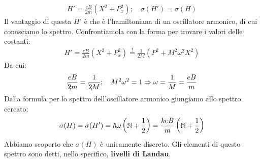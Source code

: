 \documentclass[../../FisicaTeorica.tex]{subfiles}
\begin{document}
\begin{enumerate}
\begin{align*}
H'=\frac{eB}{2m}\left(X^2+P_x^2\right); \quad \sigma(H')=\sigma(H)
\end{align*} 
Il vantaggio di questa $H'$ è che è l'hamiltoniana di un oscillatore armonico, di cui conosciamo lo spettro. Confrontiamola con la forma  per trovare i valori delle costanti:
\begin{align*}
H'=\frac{eB}{2m}\left(X^2 + P_x^2\right) \overset{!}{=} \frac{1}{2M}\left(P^2 + M^2 \omega^2 X^2\right)
\end{align*}
Da cui:
\begin{align*}
\frac{eB}{\bcancel{2}m} = \frac{1}{\bcancel{2}M};\quad M^2\omega^2 = 1 \Rightarrow  \omega =\frac{1}{M}=\frac{eB}{m}
\end{align*}
Dalla formula per lo spettro dell'oscillatore armonico giungiamo allo spettro cercato:
\begin{align*}
\sigma(H) = \sigma(H')= \hbar \omega\left(\mathbb{N}+\frac{1}{2}\right) = \frac{\hbar eB}{m}\left(\mathbb{N}+\frac{1}{2}\right)
\end{align*}
Abbiamo scoperto che $\sigma(H)$ è unicamente discreto. Gli elementi di questo spettro sono detti, nello specifico, \textbf{livelli di Landau}.\\


\end{enumerate}
\end{document}
